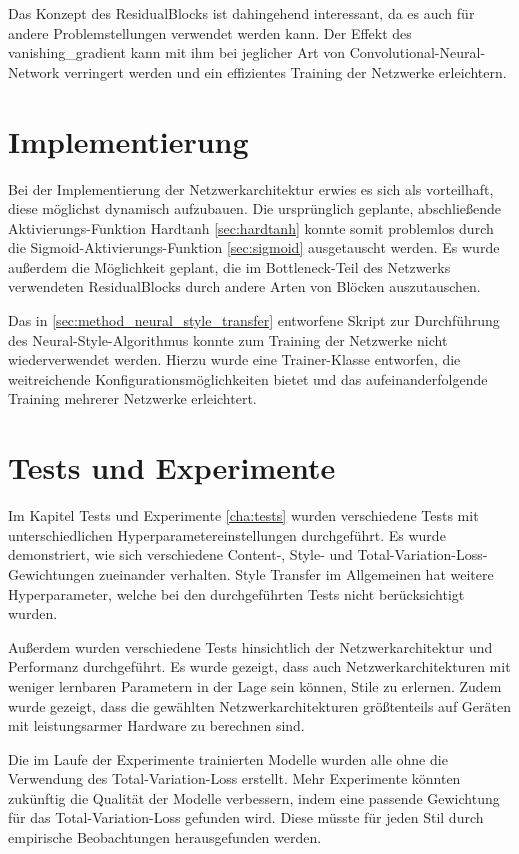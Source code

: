 Das Konzept des ResidualBlocks ist dahingehend interessant, da es auch für andere Problemstellungen verwendet werden kann. Der Effekt des \gls{vanishing_gradient} kann mit ihm bei jeglicher Art von Convolutional-Neural-Network verringert werden und ein effizientes Training der Netzwerke erleichtern.

\section{Implementierung}

Bei der Implementierung der Netzwerkarchitektur erwies es sich als vorteilhaft, diese möglichst dynamisch aufzubauen. Die ursprünglich geplante, abschließende Aktivierungs-Funktion Hardtanh \ref{sec:hardtanh} konnte somit problemlos durch die Sigmoid-Aktivierungs-Funktion \ref{sec:sigmoid} ausgetauscht werden. Es wurde außerdem die Möglichkeit geplant, die im Bottleneck-Teil des Netzwerks verwendeten ResidualBlocks durch andere Arten von Blöcken auszutauschen.

Das in \ref{sec:method_neural_style_transfer} entworfene Skript zur Durchführung des Neural-Style-Algorithmus konnte zum Training der Netzwerke nicht wiederverwendet werden. Hierzu wurde eine Trainer-Klasse entworfen, die weitreichende Konfigurationsmöglichkeiten bietet und das aufeinanderfolgende Training mehrerer Netzwerke erleichtert.

\section{Tests und Experimente}

Im Kapitel Tests und Experimente \ref{cha:tests} wurden verschiedene Tests mit unterschiedlichen Hyperparametereinstellungen durchgeführt.
Es wurde demonstriert, wie sich verschiedene Content-, Style- und Total-Variation-Loss-Gewichtungen zueinander verhalten. Style Transfer im Allgemeinen hat weitere Hyperparameter, welche bei den durchgeführten Tests nicht berücksichtigt wurden.

Außerdem wurden verschiedene Tests hinsichtlich der Netzwerkarchitektur und Performanz durchgeführt. Es wurde gezeigt, dass auch Netzwerkarchitekturen mit weniger lernbaren Parametern in der Lage sein können, Stile zu erlernen. Zudem wurde gezeigt, dass die gewählten Netzwerkarchitekturen größtenteils auf Geräten mit leistungsarmer Hardware zu berechnen sind.

Die im Laufe der Experimente trainierten Modelle wurden alle ohne die Verwendung des Total-Variation-Loss erstellt. Mehr Experimente könnten zukünftig die Qualität der Modelle verbessern, indem eine passende Gewichtung für das Total-Variation-Loss gefunden wird. Diese müsste für jeden Stil durch empirische Beobachtungen herausgefunden werden.